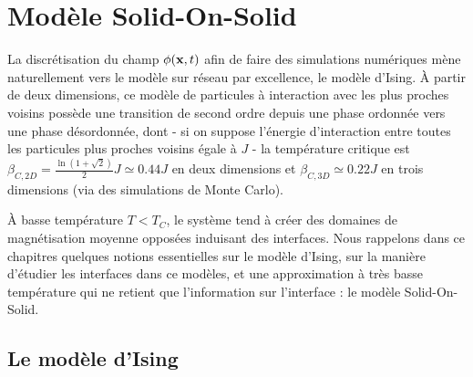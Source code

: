 \chapter{Modèle Solid-On-Solid}

La discrétisation du champ $\phi({\bf x},t)$ afin de faire des simulations numériques mène naturellement vers le modèle sur réseau par excellence, le modèle d'Ising. À partir de deux dimensions, ce modèle de particules à interaction avec les plus proches voisins possède une transition de second ordre depuis une phase ordonnée vers une phase désordonnée, dont - si on suppose l'énergie d'interaction entre toutes les particules plus proches voisins égale à $J$ - la température critique est $\beta_{C,2D} =  \frac{\ln(1+\sqrt{2})}{2} J \simeq 0.44 J$ en deux dimensions \cite{onsager_crystal_1944} et $\beta_{C,3D} \simeq 0.22 J$ en trois dimensions \cite{talapov_magnetization_1996} (via des simulations de Monte Carlo).

À basse température $T \less T_C$, le système tend à créer des domaines de magnétisation moyenne opposées induisant des interfaces. Nous rappelons dans ce chapitres quelques notions essentielles sur le modèle d'Ising, sur la manière d'étudier les interfaces dans ce modèles, et une approximation à très basse température qui ne retient que l'information sur l'interface : le modèle Solid-On-Solid.

		  \section{Le modèle d'Ising}
  
